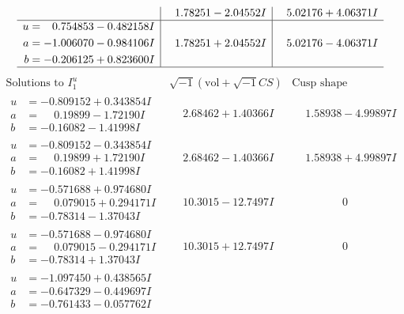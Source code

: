 \documentclass[1p]{elsarticle_modified}
\theoremstyle{definition}
\newcommand{\I}{\sqrt{-1}}
\begin{document}
$$\begin{array}{c|c|c}
 & \phantom{-}1.78251 - 2.04552 I & \phantom{-}5.02176 + 4.06371 I \\ \hline\begin{aligned}
u &= \phantom{-}0.754853 - 0.482158 I \\
a &= -1.006070 - 0.984106 I \\
b &= -0.206125 + 0.823600 I\end{aligned}
 & \phantom{-}1.78251 + 2.04552 I & \phantom{-}5.02176 - 4.06371 I\\
 \hline 
 \end{array}$$\newpage$$\begin{array}{c|c|c}  
\text{Solutions to }I^u_{1}& \I (\text{vol} + \sqrt{-1}CS) & \text{Cusp shape}\\
 \hline 
\begin{aligned}
u &= -0.809152 + 0.343854 I \\
a &= \phantom{-}0.19899 - 1.72190 I \\
b &= -0.16082 - 1.41998 I\end{aligned}
 & \phantom{-}2.68462 + 1.40366 I & \phantom{-}1.58938 - 4.99897 I \\ \hline\begin{aligned}
u &= -0.809152 - 0.343854 I \\
a &= \phantom{-}0.19899 + 1.72190 I \\
b &= -0.16082 + 1.41998 I\end{aligned}
 & \phantom{-}2.68462 - 1.40366 I & \phantom{-}1.58938 + 4.99897 I \\ \hline\begin{aligned}
u &= -0.571688 + 0.974680 I \\
a &= \phantom{-}0.079015 + 0.294171 I \\
b &= -0.78314 - 1.37043 I\end{aligned}
 & \phantom{-}10.3015 - 12.7497 I & \phantom{-0.000000 } 0 \\ \hline\begin{aligned}
u &= -0.571688 - 0.974680 I \\
a &= \phantom{-}0.079015 - 0.294171 I \\
b &= -0.78314 + 1.37043 I\end{aligned}
 & \phantom{-}10.3015 + 12.7497 I & \phantom{-0.000000 } 0 \\ \hline\begin{aligned}
u &= -1.097450 + 0.438565 I \\
a &= -0.647329 - 0.449697 I \\
b &= -0.761433 - 0.057762 I\end{aligned}

\end{array}$$
\end{document}
